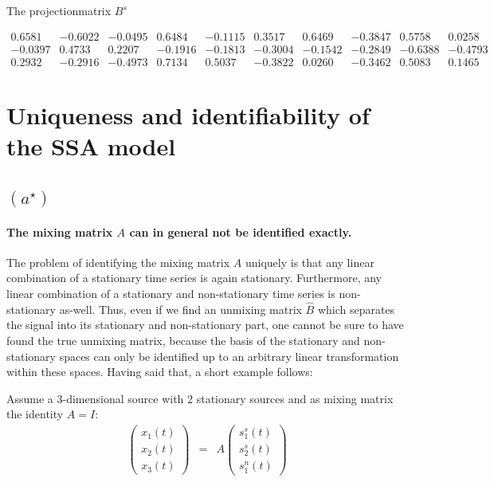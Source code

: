 \documentclass[a4paper, 12pt, titlepage]{article}
\begin{document}
The projectionmatrix $B^s$ \newline

$
\begin{matrix}

    0.6581 &  -0.6022 &  -0.0495 &   0.6484 &  -0.1115 &   0.3517 &   0.6469 &  -0.3847 &   0.5758 &	0.0258 \\
   -0.0397 &   0.4733 &   0.2207 &  -0.1916 &  -0.1813 &  -0.3004 &  -0.1542 &  -0.2849 &  -0.6388 &	-0.4793 \\
    0.2932 &  -0.2916 &  -0.4973 &   0.7134 &   0.5037 &  -0.3822 &  0.0260 &  -0.3462  &  0.5083  &    0.1465

\end{matrix}
$



\newpage
\section{Uniqueness and identifiability of the SSA model}

\subsection*{$\left(a^\star\right)$}

\paragraph{The mixing matrix $A$ can in general not be identified exactly.}

The problem of identifying the mixing matrix $A$ uniquely is that any linear combination of a stationary time series is again stationary.
Furthermore, any linear combination of a stationary and non-stationary time series is non-stationary as-well.
Thus, even if we find an unmixing matrix $\hat B$ which separates the signal into its stationary and non-stationary part, one cannot be sure to have found the true unmixing matrix, because the basis of the stationary and non-stationary spaces can only be identified up to an arbitrary linear transformation within these spaces.
Having said that, a short example follows:

Assume a 3-dimensional source with 2 stationary sources and as mixing matrix the identity $A=I$:
\begin{eqnarray}
	\left(
		\begin{array}{c}
		x_1(t)\\
		x_2(t)\\
		x_3(t)		
		\end{array}
	\right) &=& A \left(
		\begin{array}{c}
			s^s_1(t)\\
			s^s_2(t)\\
			s^n_1(t)
		\end{array}
	\right)
\end{eqnarray}
\end{document}

